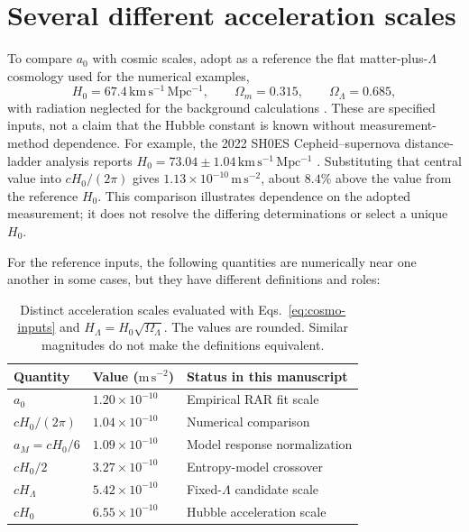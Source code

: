 \documentclass[12pt]{article}
\begin{document}
\section{Several different acceleration scales}
\label{sec:scales}

To compare $a_0$ with cosmic scales, adopt as a reference the flat matter-plus-$\Lambda$ cosmology used for the numerical examples,
\begin{equation}
  H_0=67.4\,\mathrm{km\,s^{-1}\,Mpc^{-1}},
  \qquad
  \Omega_m=0.315,
  \qquad
  \Omega_\Lambda=0.685,
  \label{eq:cosmo-inputs}
\end{equation}
with radiation neglected for the background calculations \cite{Planck}. These are specified inputs, not a claim that the Hubble constant is known without measurement-method dependence. For example, the 2022 SH0ES Cepheid--supernova distance-ladder analysis reports $H_0=73.04\pm1.04\,\mathrm{km\,s^{-1}\,Mpc^{-1}}$ \cite{Riess}. Substituting that central value into $cH_0/(2\pi)$ gives $1.13\times10^{-10}\,\mathrm{m\,s^{-2}}$, about $8.4\%$ above the value from the reference $H_0$. This comparison illustrates dependence on the adopted measurement; it does not resolve the differing determinations or select a unique $H_0$.

For the reference inputs, the following quantities are numerically near one another in some cases, but they have different definitions and roles:
\begin{table}[ht]
  \centering
  \small
  \begin{tabular}{@{}lll@{}}
    \toprule
    Quantity & Value ($\mathrm{m\,s^{-2}}$) & Status in this manuscript \\
    \midrule
    $a_0$ & $1.20\times10^{-10}$ & Empirical RAR fit scale \\
    $cH_0/(2\pi)$ & $1.04\times10^{-10}$ & Numerical comparison \\
    $a_M=cH_0/6$ & $1.09\times10^{-10}$ & Model response normalization \\
    $cH_0/2$ & $3.27\times10^{-10}$ & Entropy-model crossover \\
    $cH_\Lambda$ & $5.42\times10^{-10}$ & Fixed-$\Lambda$ candidate scale \\
    $cH_0$ & $6.55\times10^{-10}$ & Hubble acceleration scale \\
    \bottomrule
  \end{tabular}
  \caption{Distinct acceleration scales evaluated with Eqs.~\eqref{eq:cosmo-inputs} and $H_\Lambda=H_0\sqrt{\Omega_\Lambda}$. The values are rounded. Similar magnitudes do not make the definitions equivalent.}
  \label{tab:acceleration-scales}
\end{table}
\end{document}
